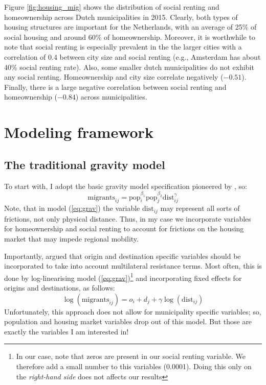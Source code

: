 \documentclass[fleqn,10pt]{SelfArx} %
\begin{document}
        Figure \ref{fig:housing_mig} shows the distribution of social
        renting and homeownership across Dutch municipalities in 2015.
        Clearly, both types of housing structures are important for
        the Netherlands, with an average of 25\% of social housing and
        around 60\% of homeownership. Moreover, it is worthwhile to
        note that social renting is especially prevalent in the the
        larger cities with a correlation of 0.4 between city size and
        social renting (e.g., Amsterdam has about 40\% social renting
        rate). Also, some smaller dutch municipalities do not exhibit
        any social renting. Homeownership and city size correlate
        negatively ($-0.51$). Finally, there is a large negative
        correlation between social renting and homeownership ($-0.84$) across municipalities.
        
        \section{Modeling framework}

        \subsection{The traditional gravity model}

        To start with, I adopt the basic gravity model specification pioneered by
        \citet{tinbergen1962shaping}, so:
        \begin{equation}
          \text{migrants}_{ij} = \text{pop}_i^{\beta_1}\text{pop}_j^{\beta_2}\text{dist}_{ij}^\gamma
          \label{eq:grav}
        \end{equation}
        Note, that in model (\ref{eq:grav}) the variable
        $\text{dist}_{ij}$ may represent all sorts of frictions, not
        only physical distance. Thus, in my case we incorporate
        variables for homeownership and social renting to account for
        frictions on the housing market that may impede regional
        mobility.

        Importantly, \citet{anderson2003gravity} argued that origin
        and destination specific variables should be incorporated to
        take into account multilateral resistance terms. Most often,
        this is done by log-linearising model
        (\ref{eq:grav})\footnote{In our case, note that zeros are
          present in our social renting variable. We therefore add a
          small number to this variables (0.0001). Doing this only on
          the \emph{right-hand side} does not affects our results} and
        incorporating fixed effects for origins and destinations, as
        follows:
        \begin{equation}
          \log(\text{migrants}_{ij}) = o_i + d_j +  \gamma\log(\text{dist}_{ij})
          \label{eq:gravfixed}
        \end{equation} 
        Unfortunately, this approach does not allow for municipality
        specific variables; so, population and housing market
        variables drop out of this model. But those are exactly the
        variables I am  interested in!
\end{document}
